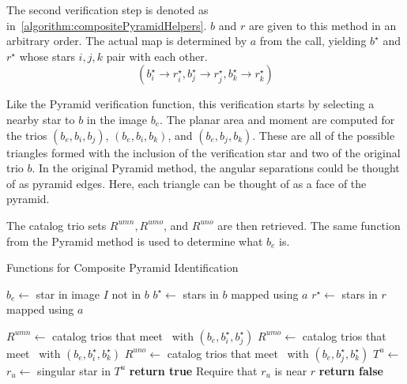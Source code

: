 The second verification step is denoted as 
in~\autoref{algorithm:compositePyramidHelpers}.
$b$ and $r$ are given to this method in an arbitrary order.
The actual map is determined by $a$ from the  call, yielding $b^{\star}$ and $r^{\star}$ whose stars $i, j,
k$ pair with each other.
\begin{equation}
    (b^\star_i \rightarrow r^\star_i, b^\star_j \rightarrow r^\star_j, b^\star_k \rightarrow r^\star_k )
\end{equation}

Like the Pyramid verification function, this verification starts by selecting a nearby star to $b$ in the image $b_e$.
The planar area and moment are computed for the trios $(b_e, b_i, b_j)$, $(b_e, b_i, b_k)$, and $(b_e, b_j, b_k)$.
These are all of the possible triangles formed with the inclusion of the verification star and two of the original
trio $b$.
In the original Pyramid method, the angular separations could be thought of as pyramid edges.
Here, each triangle can be thought of as a face of the pyramid.

The catalog trio sets $R^{umn}, R^{umo}$, and $R^{uno}$ are then retrieved.
The same function  from the Pyramid method is used to determine what $b_e$ is.
\begin{algorithm}
    \caption{Functions for Composite Pyramid Identification} \label{algorithm:compositePyramidHelpers}
    \begin{algorithmic}[1]
        \State $b_e \gets $ star in image $I$ not in $b$
        \State $b^{\star} \gets $ stars in $b$ mapped using $a$
        \State $r^{\star} \gets $ stars in $r$ mapped using $a$

        \State $R^{umn} \gets $ catalog trios that meet~ with $(b_e, b^{\star}_i,
        b^{\star}_j)$
        \State $R^{umo} \gets $ catalog trios that meet~ with $(b_e, b^{\star}_i,
        b^{\star}_k)$
        \State $R^{uno} \gets $ catalog trios that meet~ with $(b_e, b^{\star}_j,
        b^{\star}_k)$
        \State $T^u \gets $ 
        \\
        \State $r_u \gets $ singular star in $T^u$
        \State \textbf{return true} \Comment Require that $r_u$ is near $r$
        \EndIf
        \EndIf
        \State \textbf{return false}
        \EndFunction
    \end{algorithmic}
\end{algorithm}

\begin{table*}[ht]
\end{table*}